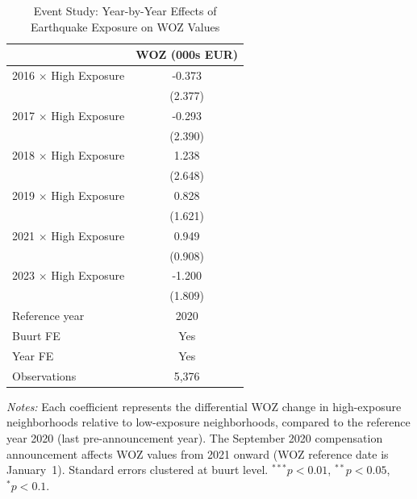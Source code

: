 \begin{table}[htbp]
\centering
\caption{Event Study: Year-by-Year Effects of Earthquake Exposure on WOZ Values}
\label{tab:event_study}
\begin{tabular}{lc}
\hline\hline
 & WOZ (000s EUR) \\
\hline
2016 $\times$ High Exposure & -0.373 \\
 & (2.377) \\[3pt]
2017 $\times$ High Exposure & -0.293 \\
 & (2.390) \\[3pt]
2018 $\times$ High Exposure & 1.238 \\
 & (2.648) \\[3pt]
2019 $\times$ High Exposure & 0.828 \\
 & (1.621) \\[3pt]
2021 $\times$ High Exposure & 0.949 \\
 & (0.908) \\[3pt]
2023 $\times$ High Exposure & -1.200 \\
 & (1.809) \\[3pt]
\hline
Reference year & 2020 \\
Buurt FE & Yes \\
Year FE & Yes \\
Observations & 5,376 \\
\hline\hline
\end{tabular}
\begin{tablenotes}[flushleft]
\small
\item \textit{Notes:} Each coefficient represents the differential WOZ change in high-exposure neighborhoods relative to low-exposure neighborhoods, compared to the reference year 2020 (last pre-announcement year). The September 2020 compensation announcement affects WOZ values from 2021 onward (WOZ reference date is January~1). Standard errors clustered at buurt level. $^{***}p<0.01$, $^{**}p<0.05$, $^{*}p<0.1$.
\end{tablenotes}
\end{table}
